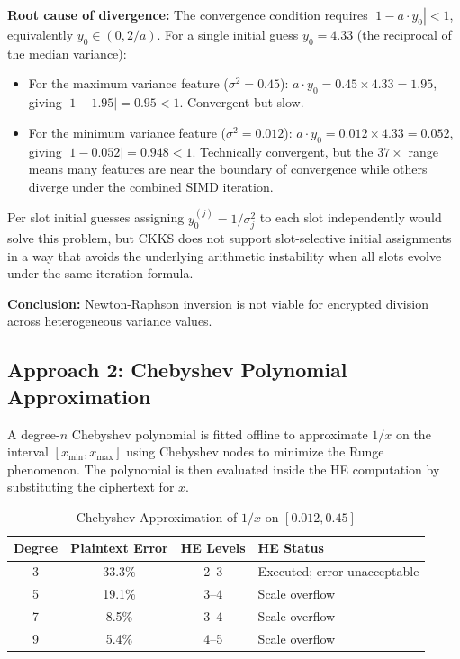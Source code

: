 \textbf{Root cause of divergence:} The convergence condition requires
$|1 - a \cdot y_0| < 1$, equivalently $y_0 \in (0, 2/a)$. For a single
initial guess $y_0 = 4.33$ (the reciprocal of the median variance):
\begin{itemize}
  \item For the maximum variance feature ($\sigma^2 = 0.45$): $a \cdot y_0
  = 0.45 \times 4.33 = 1.95$, giving $|1 - 1.95| = 0.95 < 1$. Convergent
  but slow.
  \item For the minimum variance feature ($\sigma^2 = 0.012$): $a \cdot y_0
  = 0.012 \times 4.33 = 0.052$, giving $|1 - 0.052| = 0.948 < 1$.
  Technically convergent, but the $37\times$ range means many features
  are near the boundary of convergence while others diverge under the
  combined SIMD iteration.
\end{itemize}

Per slot initial guesses assigning $y_0^{(j)} = 1/\sigma_j^2$ to each slot
independently  would solve this problem, but CKKS does not support
slot-selective initial assignments in a way that avoids the underlying
arithmetic instability when all slots evolve under the same iteration formula.

\textbf{Conclusion:} Newton-Raphson inversion is not viable for encrypted
division across heterogeneous variance values.

\subsection{Approach 2: Chebyshev Polynomial Approximation}

A degree-$n$ Chebyshev polynomial is fitted offline to approximate $1/x$ on
the interval $[x_{\min}, x_{\max}]$ using Chebyshev nodes to minimize the
Runge phenomenon. The polynomial is then evaluated inside the HE computation
by substituting the ciphertext for $x$.

\begin{table}[H]
\centering
\caption{Chebyshev Approximation of $1/x$ on $[0.012, 0.45]$}
\label{tab:cheb}
\begin{tabular}{cccl}
\toprule
\textbf{Degree} & \textbf{Plaintext Error} & \textbf{HE Levels} & \textbf{HE Status} \\
\midrule
3 & 33.3\% & 2--3 & Executed; error unacceptable \\
5 & 19.1\% & 3--4 & Scale overflow \\
7 & 8.5\%  & 3--4 & Scale overflow \\
9 & 5.4\%  & 4--5 & Scale overflow \\
\bottomrule
\end{tabular}
\end{table}


